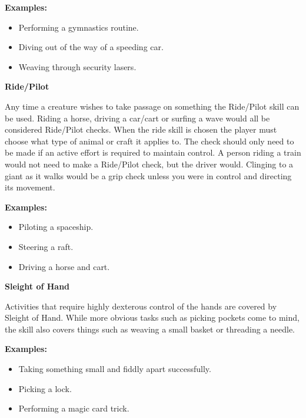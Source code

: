 \begin{displayquote}
    \textbf{Examples:}
    \begin{itemize}
        \item Performing a gymnastics routine.
        \item Diving out of the way of a speeding car.
        \item Weaving through security lasers.
    \end{itemize}
\end{displayquote}

\textbf{Ride/Pilot}

Any time a creature wishes to take passage on something the Ride/Pilot skill can be used. Riding a horse, driving a car/cart or surfing a wave would all be considered Ride/Pilot checks. When the ride skill is chosen the player must choose what type of animal or craft it applies to. The check should only need to be made if an active effort is required to maintain control. A person riding a train would not need to make a Ride/Pilot check, but the driver would. Clinging to a giant as it walks would be a grip check unless you were in control and directing its movement.

\begin{displayquote}
    \textbf{Examples:}
    \begin{itemize}
        \item Piloting a spaceship.
        \item Steering a raft.
        \item Driving a horse and cart.
    \end{itemize}
\end{displayquote}

\textbf{Sleight of Hand}

Activities that require highly dexterous control of the hands are covered by Sleight of Hand. While more obvious tasks such as picking pockets come to mind, the skill also covers things such as weaving a small basket or threading a needle.

\begin{displayquote}
    \textbf{Examples:}
    \begin{itemize}
        \item Taking something small and fiddly apart successfully.
        \item Picking a lock.
        \item Performing a magic card trick.
    \end{itemize}
\end{displayquote}

